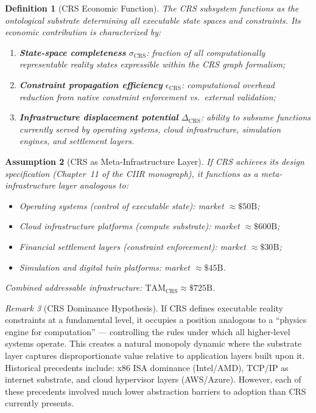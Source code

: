 \documentclass[11pt,a4paper]{article}
\newtheorem{definition}{Definition}[section]
\newtheorem{assumption}[definition]{Assumption}
\theoremstyle{remark}
\newtheorem{remark}[definition]{Remark}
\newcommand{\TAM}{\mathrm{TAM}}
\newcommand{\interpretive}[1]{\textcolor{blue!70!black}{#1}}
\begin{document}
\begin{definition}[CRS Economic Function]
\label{def:crs_econ}
The CRS subsystem functions as the ontological substrate determining
all executable state spaces and constraints.  Its economic contribution
is characterized by:
\begin{enumerate}[nosep]
  \item \textbf{State-space completeness} $\sigma_{\mathrm{CRS}}$:
        fraction of all computationally representable reality states
        expressible within the CRS graph formalism;
  \item \textbf{Constraint propagation efficiency}
        $\epsilon_{\mathrm{CRS}}$: computational overhead reduction
        from native constraint enforcement vs.\ external validation;
  \item \textbf{Infrastructure displacement potential}
        $\Delta_{\mathrm{CRS}}$: ability to subsume functions currently
        served by operating systems, cloud infrastructure, simulation
        engines, and settlement layers.
\end{enumerate}
\end{definition}

\begin{assumption}[CRS as Meta-Infrastructure Layer]
\label{ass:crs_meta}
If CRS achieves its design specification (Chapter~11 of the CIIR
monograph), it functions as a \emph{meta-infrastructure layer}
analogous to:
\begin{itemize}[nosep]
  \item Operating systems (control of executable state):
        market $\approx \$50\text{B}$;
  \item Cloud infrastructure platforms (compute substrate):
        market $\approx \$600\text{B}$;
  \item Financial settlement layers (constraint enforcement):
        market $\approx \$30\text{B}$;
  \item Simulation and digital twin platforms:
        market $\approx \$45\text{B}$.
\end{itemize}
Combined addressable infrastructure: $\TAM_{\mathrm{CRS}} \approx
\$725\text{B}$.
\end{assumption}

\begin{remark}[CRS Dominance Hypothesis]
\label{rem:crs_dominance}
\interpretive{If CRS defines executable reality constraints at a
fundamental level, it occupies a position analogous to a ``physics
engine for computation'' --- controlling the rules under which all
higher-level systems operate.  This creates a natural monopoly dynamic
where the substrate layer captures disproportionate value relative to
application layers built upon it.  Historical precedents include: x86
ISA dominance (Intel/AMD), TCP/IP as internet substrate, and cloud
hypervisor layers (AWS/Azure).  However, each of these precedents
involved much lower abstraction barriers to adoption than CRS
currently presents.}
\end{remark}
\end{document}
